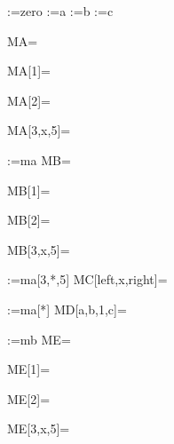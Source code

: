 \documentclass{article}
\begin{document}

\ma:={zero}
\ma[1]:={a}
\ma[2]:={b}
\ma[3,x,5]:={c}

MA=\ma\par
MA[1]=\ma[1]\par
MA[2]=\ma[2]\par
MA[3,x,5]=\ma[3,x,5]\par

\mb*:={ma}
MB=\mb\par
MB[1]=\mb[1]\par
MB[2]=\mb[2]\par
MB[3,x,5]=\mb[3,x,5]\par
:={ma[3,*,5]}
MC[left,x,right]=\par
\md*[a,b,*,c]:={ma[*]}
MD[a,b,1,c]=\md[a,b,1,c]\par

\me*:={mb}
ME=\me\par
ME[1]=\me[1]\par
ME[2]=\me[2]\par
ME[3,x,5]=\me[3,x,5]\par
\end{document}

